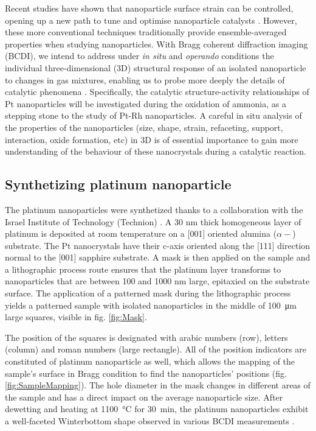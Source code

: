 Recent studies have shown that nanoparticle surface strain can be controlled, opening up a new path to tune and optimise nanoparticle catalysts \parencite{Zhang2014, Sneed2015, Wang2016}.
However, these more conventional techniques traditionally provide ensemble-averaged properties when studying nanoparticles.
With Bragg coherent diffraction imaging (BCDI), we intend to address under \textit{in situ} and \textit{operando} conditions the individual three-dimensional (3D) structural response of an isolated nanoparticle to changes in gas mixtures, enabling us to probe more deeply the details of catalytic phenomena \parencite{Fernandez2019, Passos2020, Dupraz2022}.
Specifically, the catalytic structure-activity relationships of Pt nanoparticles will be investigated during the oxidation of ammonia, as a stepping stone to the study of Pt-Rh nanoparticles.
A careful in situ analysis of the properties of the nanoparticles (size, shape, strain, refaceting, support, interaction, oxide formation, etc) in 3D is of essential importance to gain more understanding of the behaviour of these nanocrystals during a catalytic reaction.

\subsection{Synthetizing platinum nanoparticle}\label{sec:PtParticles}

The platinum nanoparticles were synthetized thanks to a collaboration with the Israel Institute of Technology (Technion) \parencite{Dupraz2017}.
A 30 nm thick homogeneous layer of platinum is deposited at room temperature on a [001] oriented alumina ($\alpha-$) substrate.
The Pt nanocrystals have their c-axis oriented along the [111] direction normal to the [001] sapphire substrate.
A mask is then applied on the sample and a lithographic process route ensures that the platinum layer transforms to nanoparticles that are between 100 and 1000 nm large, epitaxied on the substrate surface.
The application of a patterned mask during the lithographic process yields a patterned sample with isolated nanoparticles in the middle of \qty{100}{\um} large squares, visible in fig. \ref{fig:Mask}.

The position of the squares is designated with arabic numbers (row), letters (column) and roman numbers (large rectangle).
All of the position indicators are constituted of platinum nanoparticle as well, which allows the mapping of the sample's surface in Bragg condition to find the nanoparticles' positions (fig. \ref{fig:SampleMapping}).
The hole diameter in the mask changes in different areas of the sample and has a direct impact on the average nanoparticle size.
After dewetting and heating at \qty{1100}{\degreeCelsius} for \qty{30}{\minute}, the platinum nanoparticles exhibit a well-faceted Winterbottom shape observed in various BCDI measurements \parencite{Dupraz2017}.

